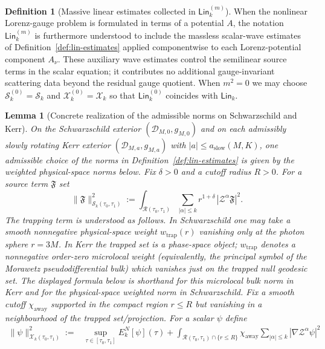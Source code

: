 \documentclass[11pt]{article}
\numberwithin{equation}{section}
\theoremstyle{plain}
\newtheorem{lemma}[theorem]{Lemma}
\theoremstyle{definition}
\newtheorem{definition}{Definition}[section]
\theoremstyle{remark}
\newcommand{\Lin}{\mathsf{Lin}}
\begin{document}
\begin{definition}[Massive linear estimates collected in $\Lin_{k}^{(m)}$]
When the nonlinear Lorenz-gauge problem is formulated in terms of a potential $A$, the notation $\Lin_{k}^{(m)}$ is furthermore understood to include the massless scalar-wave estimates of Definition~\ref{def:lin-estimates} applied componentwise to each Lorenz-potential component $A_{\nu}$. These auxiliary wave estimates control the semilinear source terms in the scalar equation; it contributes no additional gauge-invariant scattering data beyond the residual gauge quotient. When $m^{2}=0$ we may choose $\mathcal S_{k}^{(0)}=\mathcal S_{k}$ and $\mathcal X_{k}^{(0)}=\mathcal X_{k}$ so that $\Lin_{k}^{(0)}$ coincides with $\Lin_{k}$.
\end{definition}

\begin{lemma}[Concrete realization of the admissible norms on Schwarzschild and Kerr]\label{lem:concrete-admissible-norms}
On the Schwarzschild exterior $(\mathcal D_{M,0},g_{M,0})$ and on each admissibly slowly rotating Kerr exterior $(\mathcal D_{M,a},g_{M,a})$ with $|a|\le a_{\mathrm{slow}}(M,K)$,
one admissible choice of the norms in Definition~\ref{def:lin-estimates} is given by the weighted physical-space norms below.
Fix $\delta>0$ and a cutoff radius $R>0$.
For a source term $\mathfrak{F}$ set
\begin{equation}\label{eq:concrete-source-norm}
\|\mathfrak{F}\|_{\mathcal S_{k}(\tau_{0},\tau_{1})}^{2}
:=
\int_{\mathcal{R}(\tau_{0},\tau_{1})}
\sum_{|\alpha|\le k} r^{1+\delta}\,|\mathcal Z^{\alpha}\mathfrak{F}|^{2}.
\end{equation}
The trapping term is understood as follows. In Schwarzschild one may take a smooth nonnegative physical-space weight $w_{\mathrm{trap}}(r)$ vanishing only at the photon sphere $r=3M$. In Kerr the trapped set is a phase-space object; $w_{\mathrm{trap}}$ denotes a nonnegative order-zero microlocal weight (equivalently, the principal symbol of the Morawetz pseudodifferential bulk) which vanishes just on the trapped null geodesic set. The displayed formula below is shorthand for this microlocal bulk norm in Kerr and for the physical-space weighted norm in Schwarzschild. Fix a smooth cutoff $\chi_{\mathrm{away}}$ supported in the compact region $r\le R$ but vanishing in a neighbourhood of the trapped set/projection.
For a scalar $\psi$ define
\begin{eqnarray}\label{eq:concrete-solution-norm}
\|\psi\|_{\mathcal X_{k}(\tau_{0},\tau_{1})}^{2}
:={}&
\sup_{\tau\in[\tau_{0},\tau_{1}]} E^{N}_{k}[\psi](\tau)
+\int_{\mathcal{R}(\tau_{0},\tau_{1})\cap\{r\le R\}}\chi_{\mathrm{away}}\sum_{|\alpha|\le k}|\nabla \mathcal Z^{\alpha}\psi|^{2}

\end{eqnarray}
\end{lemma}
\end{document}
